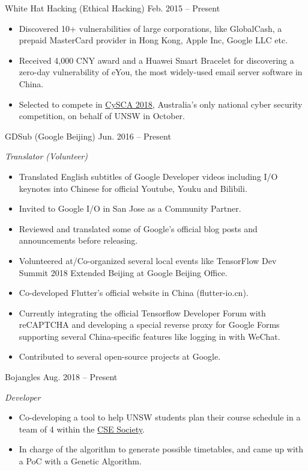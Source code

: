 \documentclass[hidelinks__VERSION__]{adamyi-cv}
\begin{document}
\begin{entrylist}


\entry
{White Hat Hacking (Ethical Hacking)}
{Feb. 2015 -- Present}
{\begin{itemize}
\item Discovered 10+ vulnerabilities of large corporations, like GlobalCash, a prepaid MasterCard provider in Hong Kong, Apple Inc, Google LLC etc.
\item Received 4,000 CNY award and a Huawei Smart Bracelet for discovering a zero-day vulnerability of eYou, the most widely-used email server software in China.
\item Selected to compete in \href{https://www.cyberchallenge.com.au/}{CySCA 2018}, Australia’s only national cyber security competition, on behalf of UNSW in October.
\end{itemize}}


\entry
{GDSub (Google Beijing)}
{Jun. 2016 -- Present}
{\emph{Translator (Volunteer)}
\begin{itemize}
\item Translated English subtitles of Google Developer videos including I/O keynotes into Chinese for official Youtube, Youku and Bilibili.
\item Invited to Google I/O in San Jose as a Community Partner.
\item Reviewed and translated some of Google's official blog posts and announcements before releasing.
\item Volunteered at/Co-organized several local events like TensorFlow Dev Summit 2018 Extended Beijing at Google Beijing Office.
\item Co-developed Flutter's official website in China (flutter-io.cn).
\item Currently integrating the official Tensorflow Developer Forum with reCAPTCHA and developing a special reverse proxy for Google Forms supporting several China-specific features like logging in with WeChat.
\item Contributed to several open-source projects at Google.
\end{itemize}}


\entry
{Bojangles}
{Aug. 2018 -- Present}
{\emph{Developer}
\begin{itemize}
\item Co-developing a tool to help UNSW students plan their course schedule in a team of 4 within the \href{https://www.csesoc.unsw.edu.au/}{CSE Society}.
\item In charge of the algorithm to generate possible timetables, and came up with a PoC with a Genetic Algorithm.
\end{itemize}}



\end{entrylist}
\end{document}
